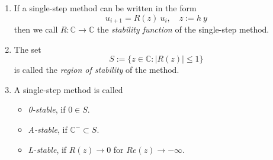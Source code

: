 		\begin{definition}
			\begin{enumerate}
				\item 
				If a single-step method can be written in the form
				\begin{equation}
					u_{i+1} = R(z) \ u_i, \quad z:= h \ y
				\end{equation}
				then we call $R: \mathbb{C} \to \mathbb{C}$ the \emph{stability function} of the single-step method.
				\item 
				The set
				\begin{equation}
					S := \{z \in \mathbb{C} : |R(z)| \leq 1\}
				\end{equation}
				is called the \emph{region of stability} of the method.
				\item 
				A single-step method is called
				\begin{itemize}
					\item \emph{0-stable}, if $0 \in S$.
					\item \emph{A-stable}, if $\mathbb{C}^- \subset S$.
					\item \emph{L-stable}, if $R(z) \to 0$ for $Re(z) \to -\infty$.
				\end{itemize}
			\end{enumerate}
		\end{definition}

		
		
		
